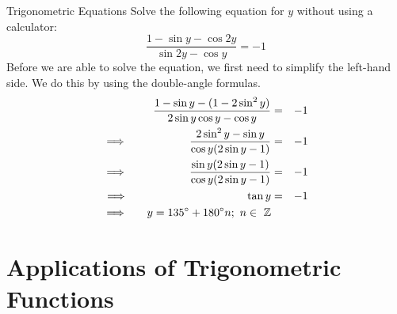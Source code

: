 \begin{wex}{Trigonometric Equations}
{
Solve the following equation for $y$ without using a calculator:
$$\frac{1-\sin y -\cos 2y}{\sin 2y-\cos y}=-1$$}
{
Before we are able to solve the equation, we first need to simplify the left-hand side. We do this by using the double-angle formulas. 
\begin{eqnarray*}
\frac{1-\sin y-(1-2 \sin^2y)}{2\sin y \cos y - \cos y}&=&-1\\
\implies \ \ \qquad \qquad \ \ \frac{2\sin^2y-\sin y}{\cos y (2 \sin y -1)}&=&-1\\
\implies \ \qquad \qquad \  \ \ \frac{\sin y(2\sin y -1)}{\cos y (2\sin y-1)}&=&-1\\
\implies \ \qquad \ \qquad \qquad \ \ \, \qquad \ \ \ \tan y &=&-1 \\
\implies \ \ \,\ \ y=135^{\circ}+180^{\circ} n; \ n\in \ \mathbb{Z}
\end{eqnarray*}
}
\end{wex}

\section{Applications of Trigonometric Functions}

